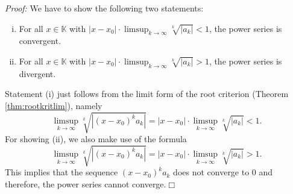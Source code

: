 
{\em Proof:} We have to show the following two statements:
\begin{enumerate}[(i)]
\item For all $x\in\mathbb{K}$ with $|x-x_0|\cdot \limsup_{k\rightarrow\infty} \sqrt[k]{|a_k|}<1$, the power series is convergent.
\item For all $x\in\mathbb{K}$ with $|x-x_0|\cdot \limsup_{k\rightarrow\infty} \sqrt[k]{|a_k|}>1$, the power series is divergent.
\end{enumerate}
Statement (i) just follows from the limit form of the root criterion (Theorem \ref{thm:rootkritlim}), namely
\[\limsup_{k \rightarrow \infty} \sqrt[k]{|(x-x_0)^ka_k|}=|x-x_0|\cdot\limsup_{k \rightarrow \infty} \sqrt[k]{|a_k|}<1.\]
\whiteskip
For showing (ii), we also make use of the formula
\[\limsup_{k \rightarrow \infty} \sqrt[k]{|(x-x_0)^ka_k|}=|x-x_0|\cdot\limsup_{k \rightarrow \infty} \sqrt[k]{|a_k|}>1.\]
This implies that the sequence $(x-x_0)^ka_k$ does not converge to 0 and therefore, the power series cannot converge.\hfill$\Box$


